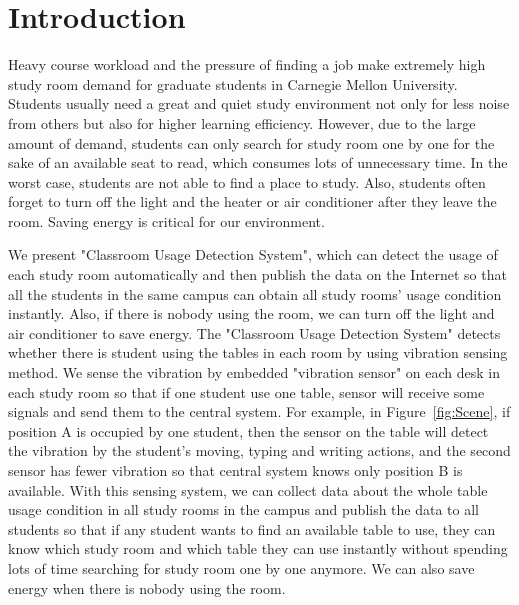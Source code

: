 \documentclass{sig-alternate-ipsn13}
\begin{document}
\section{Introduction}

Heavy course workload and the pressure of finding a job make extremely high study room demand for graduate students in Carnegie Mellon University. Students usually need a great and quiet study environment not only for less noise from others but also for higher learning efficiency. However, due to the large amount of demand, students can only search for study room one by one for the sake of an available seat to read, which consumes lots of unnecessary time. In the worst case, students are not able to find a place to study. Also, students often forget to turn off the light and the heater or air conditioner after they leave the room. Saving energy is critical for our environment. 

We present "Classroom Usage Detection System", which can detect the usage of each study room automatically and then publish the data on the Internet so that all the students in the same campus can obtain all study rooms' usage condition instantly. Also, if there is nobody using the room, we can turn off the light and air conditioner to save energy. The "Classroom Usage Detection System" detects whether there is student using the tables in each room by using vibration sensing method. We sense the vibration by embedded "vibration sensor" on each desk in each study room so that if one student use one table, sensor will receive some signals and send them to the central system. For example, in Figure~\ref{fig:Scene}, if position A is occupied by one student, then the sensor on the table will detect the vibration by the student's moving, typing and writing actions, and the second sensor has fewer vibration so that central system knows only position B is available. With this sensing system, we can collect data about the whole table usage condition in all study rooms in the campus and publish the data to all students so that if any student wants to find an available table to use, they can know which study room and which table they can use instantly without spending lots of time searching for study room one by one anymore. We can also save energy when there is nobody using the room.

\end{document}
